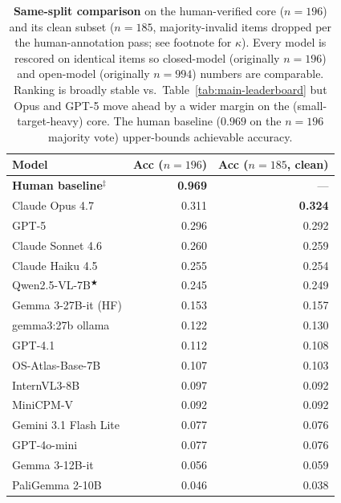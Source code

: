 \begin{table}[t]
\centering
\small
\begin{threeparttable}
\caption{\textbf{Same-split comparison} on the human-verified core
($n{=}196$) and its clean subset ($n{=}185$, majority-invalid items
dropped per the human-annotation pass; see footnote for $\kappa$).
Every model is rescored on identical items so closed-model (originally
$n{=}196$) and open-model (originally $n{=}994$) numbers are comparable.
Ranking is broadly stable vs.\ Table~\ref{tab:main-leaderboard} but Opus
and GPT-5 move ahead by a wider margin on the (small-target-heavy)
core. The human baseline ($0.969$ on the $n{=}196$ majority vote)
upper-bounds achievable accuracy.}
\label{tab:fair-core}
\begin{tabular}{@{}lrr@{}}
\toprule
\textbf{Model} & \textbf{Acc ($n{=}196$)} & \textbf{Acc ($n{=}185$, clean)} \\
\midrule
\textbf{Human baseline}$^{\ddagger}$ & \textbf{0.969} & --- \\
\midrule
Claude Opus 4.7         & 0.311          & \textbf{0.324} \\
GPT-5                   & 0.296          & 0.292 \\
Claude Sonnet 4.6       & 0.260          & 0.259 \\
Claude Haiku 4.5        & 0.255          & 0.254 \\
Qwen2.5-VL-7B$^{\bigstar}$           & 0.245          & 0.249 \\
Gemma 3-27B-it (HF)     & 0.153          & 0.157 \\
gemma3:27b ollama       & 0.122          & 0.130 \\
GPT-4.1                 & 0.112          & 0.108 \\
OS-Atlas-Base-7B        & 0.107          & 0.103 \\
InternVL3-8B            & 0.097          & 0.092 \\
MiniCPM-V               & 0.092          & 0.092 \\
Gemini 3.1 Flash Lite   & 0.077          & 0.076 \\
GPT-4o-mini             & 0.077          & 0.076 \\
Gemma 3-12B-it          & 0.056          & 0.059 \\
PaliGemma 2-10B         & 0.046          & 0.038 \\

\end{tabular}
\end{threeparttable}
\end{table}
